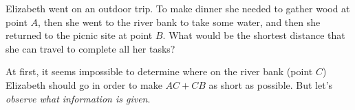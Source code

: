 \documentclass{article}
\begin{document}
\begin{example}\label{example:shortest-reflection-path}
    Elizabeth went on an outdoor trip. To make dinner she needed to gather wood at point \( A \), then she went to the river bank to take some water, and then she returned to the picnic site at point \( B \). What would be the shortest distance that she can travel to complete all her tasks?
       
\end{example}

\begin{analysis*}
    At first, it seems impossible to determine where on the river bank (point \( C \)) Elizabeth should go in order to make \( AC + CB \) as short as possible. But let's \emph{observe what information is given}.
\end{analysis*}
\end{document}
